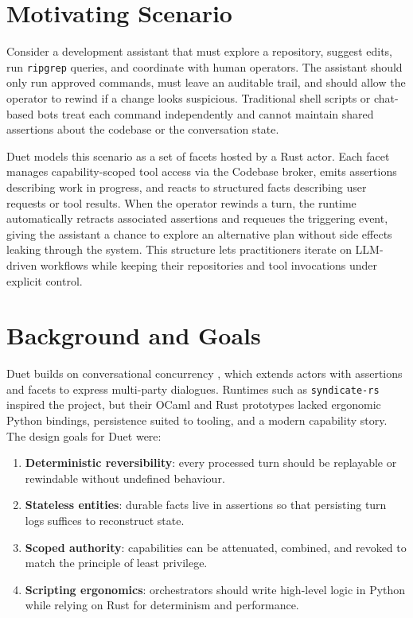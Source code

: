 \documentclass[sigplan,screen]{acmart}
\begin{document}
\section{Motivating Scenario}
\label{sec:motivating}
Consider a development assistant that must explore a repository, suggest edits,
run \texttt{ripgrep} queries, and coordinate with human operators. The assistant
should only run approved commands, must leave an auditable trail, and should
allow the operator to rewind if a change looks suspicious. Traditional shell
scripts or chat-based bots treat each command independently and cannot maintain
shared assertions about the codebase or the conversation state.

Duet models this scenario as a set of facets hosted by a Rust actor. Each facet
manages capability-scoped tool access via the Codebase broker, emits assertions
describing work in progress, and reacts to structured facts describing user
requests or tool results. When the operator rewinds a turn, the runtime
automatically retracts associated assertions and requeues the triggering event,
giving the assistant a chance to explore an alternative plan without side
effects leaking through the system. This structure lets practitioners iterate on
LLM-driven workflows while keeping their repositories and tool invocations under
explicit control.

\section{Background and Goals}
\label{sec:background}
Duet builds on conversational concurrency \cite{GarnockJonesThesis}, which
extends actors with assertions and facets to express multi-party dialogues.
Runtimes such as \texttt{syndicate-rs} inspired the project, but their OCaml and
Rust prototypes lacked ergonomic Python bindings, persistence suited to tooling,
and a modern capability story. The design goals for Duet were:

\begin{enumerate}
  \item \textbf{Deterministic reversibility}: every processed turn should be
        replayable or rewindable without undefined behaviour.
  \item \textbf{Stateless entities}: durable facts live in assertions so that
        persisting turn logs suffices to reconstruct state.
  \item \textbf{Scoped authority}: capabilities can be attenuated, combined, and
        revoked to match the principle of least privilege.
  \item \textbf{Scripting ergonomics}: orchestrators should write high-level
        logic in Python while relying on Rust for determinism and performance.
\end{enumerate}
\end{document}
